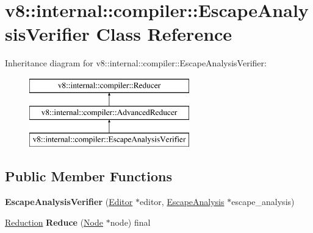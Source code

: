 \hypertarget{classv8_1_1internal_1_1compiler_1_1_escape_analysis_verifier}{}\section{v8\+:\+:internal\+:\+:compiler\+:\+:Escape\+Analysis\+Verifier Class Reference}
\label{classv8_1_1internal_1_1compiler_1_1_escape_analysis_verifier}
Inheritance diagram for v8\+:\+:internal\+:\+:compiler\+:\+:Escape\+Analysis\+Verifier\+:\begin{figure}[H]
\begin{center}
\leavevmode
\includegraphics[height=3.000000cm]{classv8_1_1internal_1_1compiler_1_1_escape_analysis_verifier}
\end{center}
\end{figure}
\subsection*{Public Member Functions}
\begin{DoxyCompactItemize}
\item 
{\bfseries Escape\+Analysis\+Verifier} (\hyperlink{classv8_1_1internal_1_1compiler_1_1_advanced_reducer_1_1_editor}{Editor} $\ast$editor, \hyperlink{classv8_1_1internal_1_1compiler_1_1_escape_analysis}{Escape\+Analysis} $\ast$escape\+\_\+analysis)\hypertarget{classv8_1_1internal_1_1compiler_1_1_escape_analysis_verifier_a511e2e1a7fea2667108e644cf8a2c1ae}{}\label{classv8_1_1internal_1_1compiler_1_1_escape_analysis_verifier_a511e2e1a7fea2667108e644cf8a2c1ae}

\item 
\hyperlink{classv8_1_1internal_1_1compiler_1_1_reduction}{Reduction} {\bfseries Reduce} (\hyperlink{classv8_1_1internal_1_1compiler_1_1_node}{Node} $\ast$node) final\hypertarget{classv8_1_1internal_1_1compiler_1_1_escape_analysis_verifier_a23b8a0803bab80e94940bc57e3731955}{}\label{classv8_1_1internal_1_1compiler_1_1_escape_analysis_verifier_a23b8a0803bab80e94940bc57e3731955}

\end{DoxyCompactItemize}

